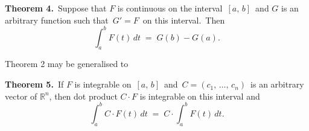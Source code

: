 \documentclass[12pt]{article}
\theoremstyle{definition}
\begin{document}
\textbf{Theorem 4.}\, Suppose that $F$ is continuous on the interval\, $[a,\,b]$\, and $G$ is an arbitrary function such that\, $G' = F$\, on this interval.\, Then
$$\int_a^b\!F(t)\,dt \;=\; G(b)\!-\!G(a).$$

Theorem 2 may be generalised to

\textbf{Theorem 5.}\, If $F$ is integrable on\, $[a,\,b]$\, and\, $C = (c_1,\,\ldots,\,c_n)$\, is an arbitrary vector of $\mathbb{R}^n$, then dot product $C\cdot F$ is integrable on this interval and
$$\int_a^b\!C\cdot F(t)\,dt \;=\; C\cdot\!\int_a^b\!F(t)\,dt.$$





\end{document}
